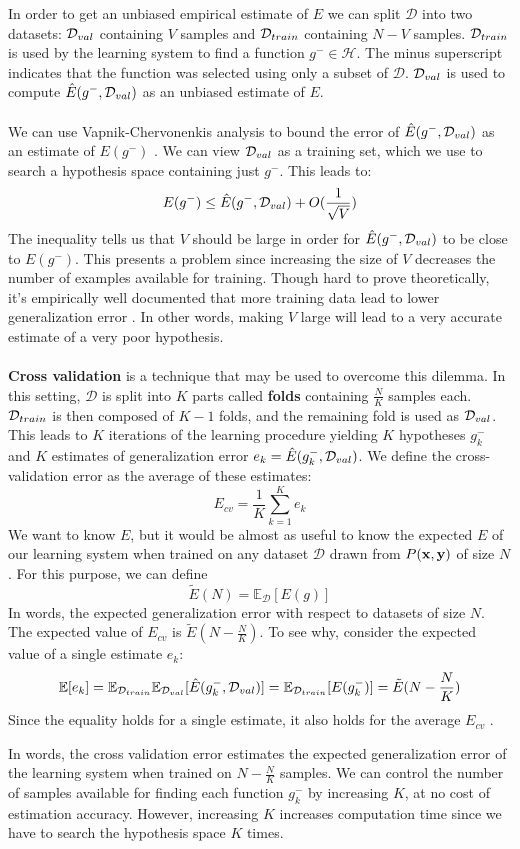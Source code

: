 In order to get an unbiased empirical estimate of $E$ we can split $\mathcal{D}$ into two datasets: $\mathcal{D}_{val}$ containing $V$ samples and $\mathcal{D}_{train}$ containing $N - V$ samples. $\mathcal{D}_{train}$ is used by the learning system to find a function $g^- \in \mathcal{H}$. The minus superscript indicates that the function was selected using only a subset of $\mathcal{D}$. $\mathcal{D}_{val}$ is used to compute $\hat{E}(g^-, \mathcal{D}_{val})$ as an unbiased estimate of $E$.
\\\\
We can use Vapnik-Chervonenkis analysis to bound the error of $\hat{E}(g^-, \mathcal{D}_{val})$ as an estimate of $E(g^-)$ \citep{yaser12}. We can view $\mathcal{D}_{val}$ as a training set, which we use to search a hypothesis space containing just $g^-$. This leads to:
$$
E(g^-) \leq \hat{E}(g^-, \mathcal{D}_{val}) + O(\frac{1}{\sqrt{V}})
$$
The inequality tells us that $V$ should be large in order for $\hat{E}(g^-, \mathcal{D}_{val})$ to be close to $E(g^-)$. This presents a problem since increasing the size of $V$ decreases the number of examples available for training. Though hard to prove theoretically, it's empirically well documented that more training data lead to lower generalization error \citep{yaser12}. In other words, making $V$ large will lead to a very accurate estimate of a very poor hypothesis.
\\\\
\textbf{Cross validation} is a technique that may be used to overcome this dilemma. In this setting, $\mathcal{D}$ is split into $K$ parts called \textbf{folds} containing $\frac{N}{K}$ samples each. $\mathcal{D}_{train}$ is then composed of $K - 1$ folds, and the remaining fold is used as $\mathcal{D}_{val}$. This leads to $K$ iterations of the learning procedure yielding $K$ hypotheses $g^-_k$ and $K$ estimates of generalization error $e_k = \hat{E}(g^-_k, \mathcal{D}_{val})$. We define the cross-validation error as the average of these estimates:
$$
E_{cv} = \frac{1}{K}\sum\limits_{k=1}^K e_k
$$
We want to know $E$, but it would be almost as useful to know the expected $E$ of our learning system when trained on any dataset $\mathcal{D}$ drawn from $P(\mathbf{x}, \mathbf{y})$ of size $N$. For this purpose, we can define 
$$
\tilde{E}(N) = \mathbb{E}_{\mathcal{D}}[E(g)]
$$
In words, the expected generalization error with respect to datasets of size $N$. The expected value of $E_{cv}$ is $\tilde{E}(N - \frac{N}{K})$. To see why, consider the expected value of a single estimate $e_k$:
$$
\mathbb{E}[e_k] = \mathbb{E}_{\mathcal{D}_{train}}\mathbb{E}_{\mathcal{D}_{val}}[\hat{E}(g^-_k, \mathcal{D}_{val})] = \mathbb{E}_{\mathcal{D}_{train}}[E(g^-_k)] = \tilde{E}(N - \frac{N}{K})
$$
Since the equality holds for a single estimate, it also holds for the average $E_{cv}$ \citep{yaser12}.

In words, the cross validation error estimates the expected generalization error of the learning system when trained on $N - \frac{N}{K}$ samples. We can control the number of samples available for finding each function $g^-_k$ by increasing $K$, at no cost of estimation accuracy. However, increasing $K$ increases computation time since we have to search the hypothesis space $K$ times.